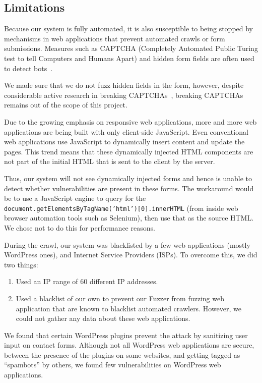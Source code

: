 \subsection[Limitations]{Limitations}
\label{limitations}

		Because our system is fully automated, it is also susceptible to being stopped by mechanisms in web applications that prevent automated crawls or form submissions. Measures such as CAPTCHA (Completely Automated Public Turing test to tell Computers and Humans Apart) and hidden form fields are often used to detect bots~\cite{captchas3, captchas2}.

		We made sure that we do not fuzz hidden fields in the form, however, despite considerable active research in breaking CAPTCHAs~\cite{captchas2, captchas}, breaking CAPTCHAs remains out of the scope of this project.

	   Due to the growing emphasis on responsive web applications, more and more web applications are being built with only client-side  JavaScript. Even conventional web applications use JavaScript to dynamically insert content and update the pages. This trend means that these dynamically injected HTML components are not part of the initial HTML that is sent to the client by the server.

		Thus, our system will not see dynamically injected forms and hence is unable to detect whether \ehi vulnerabilities are present in these forms. The workaround would be to use a JavaScript engine to query for the \texttt{document.getElementsByTagName('html')[0].innerHTML} (from inside web browser automation tools such as Selenium), then use that as the source HTML. We chose not to do this for performance reasons. 

		During the crawl, our system was blacklisted by a few web applications (mostly WordPress ones), and Internet Service Providers (ISPs).
		To overcome this, we did two things:
		\begin{enumerate}
			\item Used an IP range of 60 different IP addresses.
			\item Used a blacklist of our own to prevent our Fuzzer from fuzzing web application that are known to blacklist automated crawlers.  However, we could not gather any data about these web applications.
		\end{enumerate}

		We found that certain WordPress plugins prevent the \ehi attack by sanitizing user input on contact forms. Although not all  WordPress web applications are secure, between the presence of the plugins on some websites, and getting tagged as ``spambots'' by others, we found few vulnerabilities on WordPress web applications.


